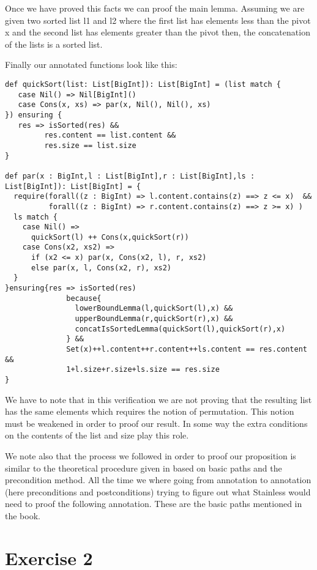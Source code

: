 \documentclass{article}
\begin{document}
Once we have proved this facts we can proof the main lemma. Assuming we are given two sorted list l1 and l2 where the first list has elements less than the pivot x and the second list has elements greater than the pivot then, the concatenation of the lists is a sorted list. 

Finally our annotated functions look like this:

\newpage
\begin{lstlisting}[label={list:first},caption=Annotated quickSort and par functions]
def quickSort(list: List[BigInt]): List[BigInt] = (list match {
   case Nil() => Nil[BigInt]()
   case Cons(x, xs) => par(x, Nil(), Nil(), xs)
}) ensuring { 
   res => isSorted(res) && 
         res.content == list.content && 
         res.size == list.size 
}
 
def par(x : BigInt,l : List[BigInt],r : List[BigInt],ls : List[BigInt]): List[BigInt] = {
  require(forall((z : BigInt) => l.content.contains(z) ==> z <= x)  && 
          forall((z : BigInt) => r.content.contains(z) ==> z >= x) )
  ls match {
    case Nil() => 
      quickSort(l) ++ Cons(x,quickSort(r))
    case Cons(x2, xs2) => 
      if (x2 <= x) par(x, Cons(x2, l), r, xs2) 
      else par(x, l, Cons(x2, r), xs2)
  }
}ensuring{res => isSorted(res) 
              because{
                lowerBoundLemma(l,quickSort(l),x) &&
                upperBoundLemma(r,quickSort(r),x) &&
                concatIsSortedLemma(quickSort(l),quickSort(r),x) 
              } &&
              Set(x)++l.content++r.content++ls.content == res.content &&
              1+l.size+r.size+ls.size == res.size
}
\end{lstlisting}  

We have to note that in this verification we are not proving that the resulting list has the same elements which requires the notion of permutation. This notion must be weakened in order to proof our result. In some way the extra conditions on the contents of the list and size play this role.

We note also that the process we followed in order to proof our proposition is similar to the theoretical procedure given in \cite{calculus-of-computation} based on basic paths and the precondition method. All the time we where going from annotation to annotation (here preconditions and postconditions) trying to figure out what Stainless would need to proof the following annotation. These are the basic paths mentioned in the book. 

\section*{Exercise 2}
\end{document}
